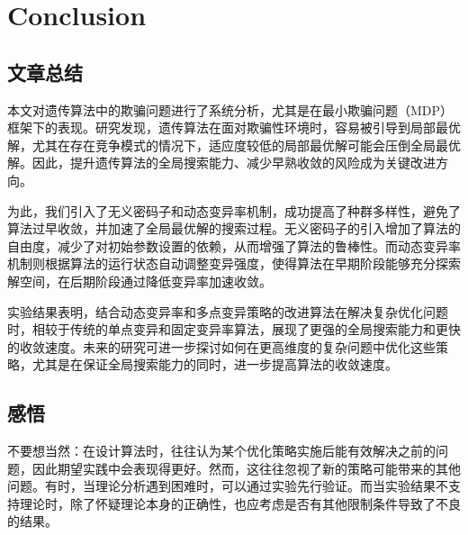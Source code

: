 \documentclass[journal=gmj]{report}%
\theoremstyle{definition}
\numberwithin{equation}{section}
\begin{document}
\section{Conclusion}

\subsection{文章总结}

本文对遗传算法中的欺骗问题进行了系统分析，尤其是在最小欺骗问题（MDP）框架下的表现。研究发现，遗传算法在面对欺骗性环境时，容易被引导到局部最优解，尤其在存在竞争模式的情况下，适应度较低的局部最优解可能会压倒全局最优解。因此，提升遗传算法的全局搜索能力、减少早熟收敛的风险成为关键改进方向。

为此，我们引入了无义密码子和动态变异率机制，成功提高了种群多样性，避免了算法过早收敛，并加速了全局最优解的搜索过程。无义密码子的引入增加了算法的自由度，减少了对初始参数设置的依赖，从而增强了算法的鲁棒性。而动态变异率机制则根据算法的运行状态自动调整变异强度，使得算法在早期阶段能够充分探索解空间，在后期阶段通过降低变异率加速收敛。

实验结果表明，结合动态变异率和多点变异策略的改进算法在解决复杂优化问题时，相较于传统的单点变异和固定变异率算法，展现了更强的全局搜索能力和更快的收敛速度。未来的研究可进一步探讨如何在更高维度的复杂问题中优化这些策略，尤其是在保证全局搜索能力的同时，进一步提高算法的收敛速度。

\subsection{感悟}

不要想当然：在设计算法时，往往认为某个优化策略实施后能有效解决之前的问题，因此期望实践中会表现得更好。然而，这往往忽视了新的策略可能带来的其他问题。有时，当理论分析遇到困难时，可以通过实验先行验证。而当实验结果不支持理论时，除了怀疑理论本身的正确性，也应考虑是否有其他限制条件导致了不良的结果。

\begin{Backmatter}



\end{Backmatter}
\end{document}
